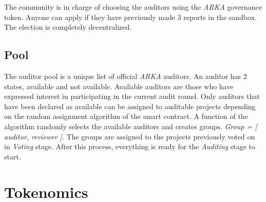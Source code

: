 \documentclass[12pt]{article}
\begin{document}
The community is in charge of choosing the auditors using the \emph{ARKA} governance token. Anyone can apply if they have previously made 3 reports in the sandbox. The election is completely decentralized.
 

\subsection { Pool }

The auditor pool is a unique list of official \emph{ARKA} auditors. An auditor has 2 states, available and not available. Available auditors are those who have expressed interest in participating in the current audit round. Only auditors that have been declared as available can be assigned to auditable projects depending on the random assignment algorithm of the smart contract. A function of the algorithm randomly selects the available auditors and creates groups. \emph{Group = [ auditor, reviewer ]}. The groups are assigned to the projects previously voted on in \emph{Voting} stage. After this process, everything is ready for the \emph{Auditing} stage to start. 


\section { Tokenomics }
\end{document}
